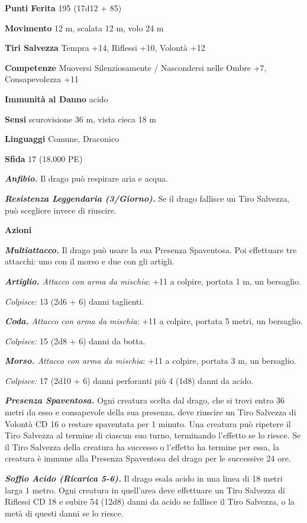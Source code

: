 \begin{multicols}{2}
\textbf{Punti Ferita} 195 (17d12 + 85)

\textbf{Movimento} 12 m, scalata 12 m, volo 24 m

\textbf{Tiri Salvezza} Tempra +14, Riflessi +10, Volontà +12

\textbf{Competenze} Muoversi Silenziosamente / Nascondersi nelle Ombre +7, Consapevolezza +11

\textbf{Immunità al Danno} acido

\textbf{Sensi} scurovisione 36 m, vista cieca 18 m 

\textbf{Linguaggi} Comune, Draconico

\textbf{Sfida} 17 (18.000 PE)

\emph{\textbf{Anfibio.}} Il drago può respirare aria e acqua.

\emph{\textbf{Resistenza Leggendaria (3/Giorno).}} Se il drago fallisce un Tiro Salvezza, può scegliere invece di riuscire.

\textbf{Azioni}

\emph{\textbf{Multiattacco.}} Il drago può usare la sua Presenza Spaventosa. Poi effettuare tre attacchi: uno con il morso e due con gli artigli.

\emph{\textbf{Artiglio.} Attacco con arma da mischia}: +11 a colpire, portata 1 m, un bersaglio.

\emph{Colpisce:} 13 (2d6 + 6) danni taglienti.

\emph{\textbf{Coda.} Attacco con arma da mischia}: +11 a colpire, portata 5 metri, un bersaglio.

\emph{Colpisce:} 15 (2d8 + 6) danni da botta.

\emph{\textbf{Morso.} Attacco con arma da mischia}: +11 a colpire, portata 3 m, un bersaglio.

\emph{Colpisce:} 17 (2d10 + 6) danni perforanti più 4 (1d8) danni da acido.

\emph{\textbf{Presenza Spaventosa.}} Ogni creatura scelta dal drago, che si trovi entro 36 metri da esso e consapevole della sua presenza, deve riuscire un Tiro Salvezza di Volontà CD 16 o restare spaventata per 1 minuto. Una creatura può ripetere il Tiro Salvezza al termine di ciascun suo turno, terminando l'effetto se lo riesce. Se il Tiro Salvezza della creatura ha successo o l'effetto ha termine per essa, la creatura è immune alla Presenza Spaventosa del drago per le successive 24 ore.

\emph{\textbf{Soffio Acido (Ricarica 5-6).}} Il drago esala acido in una linea di 18 metri larga 1 metro. Ogni creatura in quell'area deve effettuare un Tiro Salvezza di Riflessi CD 18 e subire 54 (12d8) danni da acido se fallisce il Tiro Salvezza, o la metà di questi danni se lo
riesce.


\end{multicols}
